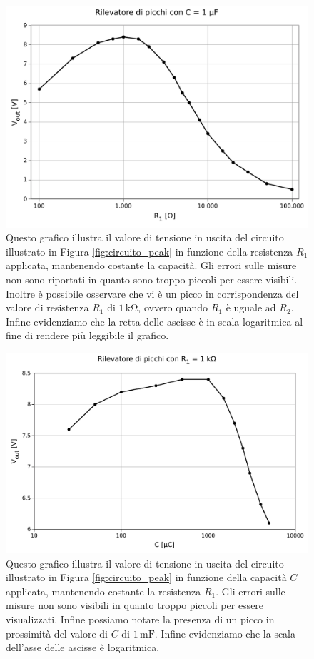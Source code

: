 \begin{figure}
    \includegraphics[scale=0.68]{capacita.pdf}
    \caption{Questo grafico illustra il valore di tensione in uscita del circuito illustrato in Figura \ref{fig:circuito_peak} in funzione della resistenza $R_1$ applicata, mantenendo costante la capacità. Gli errori sulle misure non sono riportati in quanto sono troppo piccoli per essere visibili. Inoltre è possibile osservare che vi è un picco in corrispondenza del valore di resistenza $R_1$ di $1\,\si{\kilo\ohm}$, ovvero quando $R_1$ è uguale ad $R_2$. Infine evidenziamo che la retta delle ascisse è in scala logaritmica al fine di rendere più leggibile il grafico.}
    \label{fig:capacita}
\end{figure}

\begin{figure}
    \includegraphics[scale=0.68]{resistenza.pdf}
    \caption{Questo grafico illustra il valore di tensione in uscita del circuito illustrato in Figura \ref{fig:circuito_peak} in funzione della capacità $C$ applicata, mantenendo costante la resistenza $R_1$. Gli errori sulle misure non sono visibili in quanto troppo piccoli per essere visualizzati. Infine possiamo notare la presenza di un picco in prossimità del valore di $C$ di $1\,\si{\milli\farad}$. Infine evidenziamo che la scala dell'asse delle ascisse è logaritmica.}
    \label{fig:resistenza}
\end{figure}

